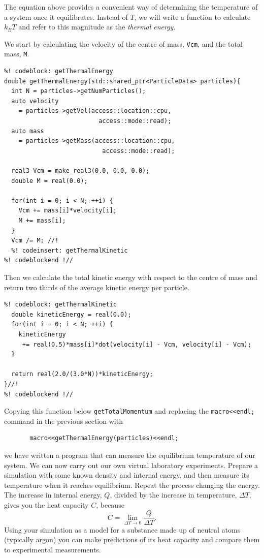 The equation above provides a convenient way of determining the temperature of a 
system once it equilibrates. Instead of $T$, we will write a function to 
calculate $k_BT$ and refer to this magnitude as the \textit{thermal energy}.

We start by calculating the velocity of the centre of mass, \texttt{Vcm}, and 
the total mass, \texttt{M}.
\begin{lstlisting}
%! codeblock: getThermalEnergy
double getThermalEnergy(std::shared_ptr<ParticleData> particles){
  int N = particles->getNumParticles();
  auto velocity
    = particles->getVel(access::location::cpu,
                          access::mode::read);
  auto mass
    = particles->getMass(access::location::cpu,
                           access::mode::read);

  real3 Vcm = make_real3(0.0, 0.0, 0.0);
  double M = real(0.0);

  for(int i = 0; i < N; ++i) {
    Vcm += mass[i]*velocity[i];
    M += mass[i];
  }
  Vcm /= M; //!
  %! codeinsert: getThermalKinetic
%! codeblockend !//
\end{lstlisting}
Then we calculate the total kinetic energy with respect to the centre of mass 
and return two thirds of the average kinetic energy per particle.
\begin{lstlisting}
%! codeblock: getThermalKinetic
  double kineticEnergy = real(0.0);
  for(int i = 0; i < N; ++i) {
    kineticEnergy
     += real(0.5)*mass[i]*dot(velocity[i] - Vcm, velocity[i] - Vcm);
  }

  return real(2.0/(3.0*N))*kineticEnergy;
}//!
%! codeblockend !//
\end{lstlisting}
Copying this function below \texttt{getTotalMomentum} and replacing the 
\texttt{macro<<endl;} command in the previous section with
\begin{lstlisting}
       macro<<getThermalEnergy(particles)<<endl;
\end{lstlisting}
we have written a program that can measure the equilibrium temperature of our 
system. We can now carry out our own virtual laboratory experiments. Prepare a 
simulation with some known density and internal energy, and then measure its 
temperature when it reaches equilibrium. Repeat the process changing the energy. 
The increase in internal energy, $Q$, divided by the increase in temperature, 
$\Delta T$, gives you the heat capacity $C$, because
\begin{equation*}
  C = \lim_{\Delta T \to 0} \frac{Q}{\Delta T}.
\end{equation*}
Using your simulation as a model for a substance made up of neutral atoms 
(typically argon) you can make predictions of its heat capacity and compare them 
to experimental measurements.

